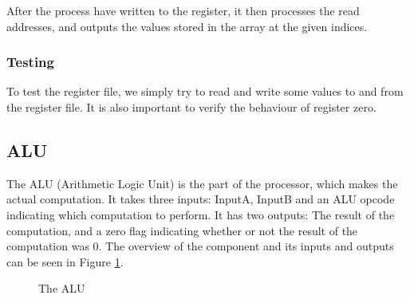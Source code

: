 After the process have written to the register, it then processes the read
addresses, and outputs the values stored in the array at the given indices.

\subsubsection*{Testing}
To test the register file, we simply try to read and write some values to and
from the register file. It is also important to verify the behaviour of
register zero.

\subsection{ALU}
The ALU (Arithmetic Logic Unit) is the part of the processor, which makes the
actual computation. It takes three inputs: InputA, InputB and an ALU opcode
indicating which computation to perform. It has two outputs: The result of the
computation, and a zero flag indicating whether or not the result of the
computation was 0. The overview of the component and its inputs and outputs can
be seen in Figure \ref{fig:alu}.

\begin{figure}
    \centering
    \caption{The ALU}
    \label{fig:alu}
\end{figure}

